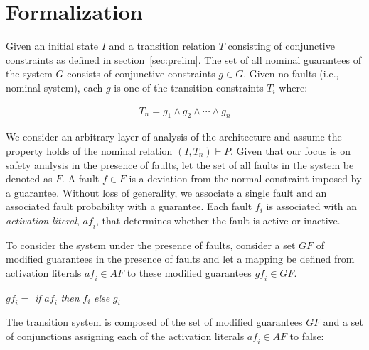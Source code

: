 \section{Formalization}
\label{sec:formalization}
Given an initial state $I$ and a transition relation $T$ consisting of conjunctive constraints as defined in section~\ref{sec:prelim}. The set of all nominal guarantees of the system $G$ consists of conjunctive constraints $g \in G$. Given no faults (i.e., nominal system), each $g$ is one of the transition constraints $T_i$ where:

\begin{gather}
T_n = g_1 \land  g_2 \land \cdots \land g_n
\label{eq:Tn}
\end{gather}

We consider an arbitrary layer of analysis of the architecture and assume the property holds of the nominal relation $(I,T_n) \vdash P$. Given that our focus is on safety analysis in the presence of faults, let the set of all faults in the system be  denoted as $F$. A fault $f \in F$ is a deviation from the normal constraint imposed by a guarantee. Without loss of generality, we associate a single fault and an associated fault probability with a guarantee. Each fault $f_i$ is associated with an \emph{activation literal}, $\mathit{af}_i$, that determines whether the fault is active or inactive. %


To consider the system under the presence of faults, consider a set $GF$ of modified guarantees in the presence of faults and let a mapping be defined from activation literals $\mathit{af}_i \in AF$ to these modified guarantees $\mathit{gf}_i \in GF$. 
\begin{center}
$\mathit{gf}_i =$ \textit{if} $\mathit{af}_i$ \textit{then} $f_i$ \textit{else} $g_i$\\
\label{eq:sigma}
\end{center}

The transition system is composed of the set of modified guarantees $GF$ and a set of conjunctions assigning each of the activation literals $\mathit{af}_i \in AF$ to false: 

